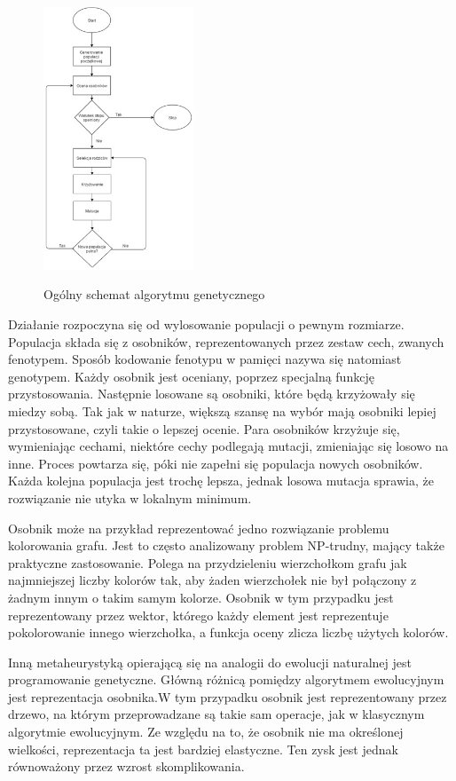 \documentclass[twoside]{iisthesis}
\begin{document}
\begin{figure}
\caption{Ogólny schemat algorytmu genetycznego}
\includegraphics[width=0.4\textwidth]{schematGA.jpg}
\label{fig:schematGA}
\end{figure}

Działanie rozpoczyna się od wylosowanie populacji o pewnym rozmiarze. Populacja składa się z osobników, reprezentowanych przez zestaw cech, zwanych fenotypem. Sposób kodowanie fenotypu w pamięci nazywa się natomiast genotypem. Każdy osobnik jest oceniany, poprzez specjalną funkcję przystosowania. Następnie losowane są osobniki, które będą krzyżowały się miedzy sobą. Tak jak w naturze, większą szansę na wybór mają osobniki lepiej przystosowane, czyli takie o lepszej ocenie. Para osobników krzyżuje się, wymieniając cechami, niektóre cechy podlegają mutacji, zmieniając się losowo na inne. Proces powtarza się, póki nie zapełni się populacja nowych osobników. Każda kolejna populacja jest trochę lepsza, jednak losowa mutacja sprawia, że rozwiązanie nie utyka w lokalnym minimum. 

Osobnik może na przykład reprezentować jedno rozwiązanie problemu kolorowania grafu. Jest to często analizowany problem NP-trudny, mający także praktyczne zastosowanie. Polega na przydzieleniu wierzchołkom grafu jak najmniejszej liczby kolorów tak, aby żaden wierzchołek nie był połączony z żadnym innym o takim samym kolorze. Osobnik w tym przypadku jest reprezentowany przez wektor, którego każdy element jest reprezentuje pokolorowanie innego wierzchołka, a funkcja oceny zlicza liczbę użytych kolorów. 

Inną metaheurystyką opierającą się na analogii do ewolucji naturalnej jest programowanie genetyczne. Główną różnicą pomiędzy algorytmem ewolucyjnym jest reprezentacja osobnika.W tym przypadku osobnik jest reprezentowany przez drzewo, na którym przeprowadzane są takie sam operacje, jak w klasycznym algorytmie ewolucyjnym. Ze względu na to, że osobnik nie ma określonej wielkości, reprezentacja ta jest bardziej elastyczne. Ten zysk jest jednak równoważony przez wzrost skomplikowania.
\end{document}

